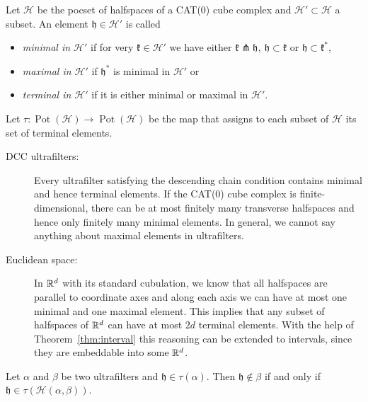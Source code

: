 \begin{defin}
  \label{defin:tau}
  Let \(\mathcal{H}\) be the pocset of halfspaces of a CAT(0) cube complex and \(\mathcal{H}' \subset \mathcal{H}\) a subset. An element \(\mathfrak{h} \in \mathcal{H}'\) is called
  \begin{itemize}
  \item \emph{minimal in \(\mathcal{H}'\)} if for very \(\mathfrak{k} \in \mathcal{H'}\) we have either \(\mathfrak{k} \pitchfork \mathfrak{h},\ \mathfrak{h} \subset \mathfrak{k}\) or \(\mathfrak{h} \subset \mathfrak{k}^\ast\),
  \item \emph{maximal in \(\mathcal{H}'\)} if \(\mathfrak{h}^\ast\) is minimal in \(\mathcal{H}'\) or
  \item \emph{terminal in \(\mathcal{H}'\)} if it is either minimal or maximal in \(\mathcal{H}'\).
  \end{itemize}
  Let \(\tau\colon \operatorname{Pot}(\mathcal{H}) \to \operatorname{Pot}(\mathcal{H})\) be the map that assigns to each subset of \(\mathcal{H}\) its set of terminal elements.
\end{defin}

\begin{bsp}
  \label{bsp:finite-terminal}
  \begin{description}
  \item[DCC ultrafilters:] Every ultrafilter satisfying the descending chain condition contains minimal and hence terminal elements. If the CAT(0) cube complex is finite-dimensional, there can be at most finitely many transverse halfspaces and hence only finitely many minimal elements. In general, we cannot say anything about maximal elements in ultrafilters. 
  \item[Euclidean space:] In \(\mathbb{R}^d\) with its standard cubulation, we know that all halfspaces are parallel to coordinate axes and along each axis we can have at most one minimal and one maximal element. This implies that any subset of halfspaces of \(\mathbb{R}^d\) can have at most \(2d\) terminal elements. With the help of Theorem~\ref{thm:interval} this reasoning can be extended to intervals, since they are embeddable into some \(\mathbb{R}^d\).
  \end{description}
\end{bsp}

\begin{lemma}[{\cite[Lemma~4.12]{MR3509968}}]
  \label{lem:4.12}
  Let \(\alpha\) and \(\beta\) be two ultrafilters and \(\mathfrak{h} \in \tau(\alpha)\). Then \(\mathfrak{h} \notin \beta\) if and only if \(\mathfrak{h} \in \tau(\mathcal{H}(\alpha,\beta))\).
\end{lemma}

